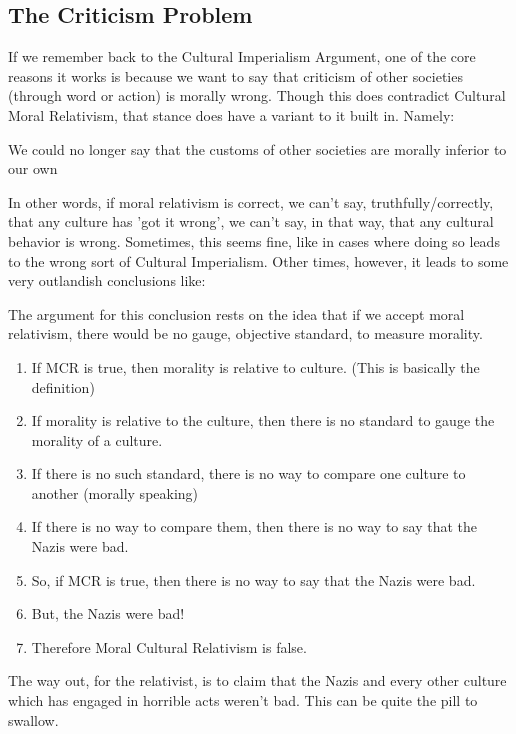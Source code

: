 \subsection{The Criticism Problem}

If we remember back to the Cultural Imperialism Argument, one of the core reasons it works is because we want to say that criticism of other societies (through word or action) is morally wrong. Though this does contradict Cultural Moral Relativism, that stance does have a variant to it built in. Namely:
\begin{center}
We could no longer say that the customs of other societies are morally inferior to our own
\end{center}
In other words, if moral relativism is correct, we can't say, truthfully/correctly, that any culture has 'got it wrong', we can't say, in that way, that any cultural behavior is wrong. Sometimes, this seems fine, like in cases where doing so leads to the wrong sort of Cultural Imperialism. Other times, however, it leads to some very outlandish conclusions like:

The argument for this conclusion rests on the idea that if we accept moral relativism, there would be no gauge, objective standard, to measure morality.
\begin{enumerate}
    \item If MCR is true, then morality is relative to culture. (This is basically the definition)
    \item If morality is relative to the culture, then there is no standard to gauge the morality of a culture.
    \item If there is no such standard, there is no way to compare one culture to another (morally speaking)
    \item If there is no way to compare them, then there is no way to say that the Nazis were bad.
    \item So, if MCR is true, then there is no way to say that the Nazis were bad.
    \item But, the Nazis were bad!
    \item Therefore Moral Cultural Relativism is false.
\end{enumerate}
The way out, for the relativist, is to claim that the Nazis and every other culture which has engaged in horrible acts weren't bad. This can be quite the pill to swallow. 
